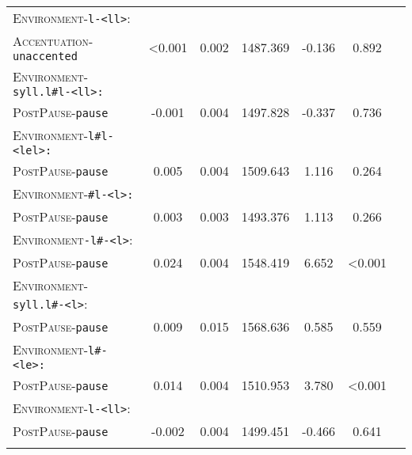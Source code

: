 \begin{table}
{\begin{tabular}{lSSSSSS}
		\textsc{Environment}-\texttt{l-<ll>}:&&&&&\\
		\textsc{Accentuation}-\texttt{unaccented} & \color{lsLightGray} <0.001 &\color{lsLightGray}  0.002 & \color{lsLightGray} 1487.369 &\color{lsLightGray}  -0.136 & \color{lsLightGray} 0.892 \\ 
		
		\textsc{Environment}-\texttt{syll.l\#l-<ll>:}&&&&&\\
		\textsc{PostPause}-\texttt{pause} &\color{lsLightGray}  -0.001 &\color{lsLightGray}  0.004 & \color{lsLightGray} 1497.828 &\color{lsLightGray}  -0.337 & \color{lsLightGray} 0.736 \\ 
		
		\textsc{Environment}-\texttt{l\#l-<lel>:}&&&&&\\
		\textsc{PostPause}-\texttt{pause} &\color{lsLightGray}  0.005 &\color{lsLightGray}  0.004 &\color{lsLightGray} 1509.643 & \color{lsLightGray} 1.116 &\color{lsLightGray}  0.264 \\ 
		
		\textsc{Environment}-\texttt{\#l-<l>:}&&&&&\\
		\textsc{PostPause}-\texttt{pause} & \color{lsLightGray} 0.003 &\color{lsLightGray}  0.003 & \color{lsLightGray} 1493.376 &\color{lsLightGray}  1.113 & \color{lsLightGray} 0.266 \\ 
		
		\textsc{Environment}\texttt{-l\#-<l>}:&&&&&\\
		\textsc{PostPause}-\texttt{pause} & 0.024 & 0.004 & 1548.419 & 6.652 &  <0.001 \\ 
		
		\textsc{Environment}-\texttt{syll.l\#-<l>}:&&&&&\\
		\textsc{PostPause}-\texttt{pause} &\color{lsLightGray}  0.009 &\color{lsLightGray}  0.015 & \color{lsLightGray} 1568.636 &\color{lsLightGray}  0.585 & \color{lsLightGray} 0.559 \\ 
		
		\textsc{Environment}-\texttt{l\#-<le>:}&&&&&\\
		\textsc{PostPause}-\texttt{pause} & 0.014 & 0.004 & 1510.953 & 3.780 &  <0.001 \\
		
		\textsc{Environment}-\texttt{l-<ll>}:&&&&&\\
		\textsc{PostPause}-\texttt{pause} & \color{lsLightGray} -0.002 & \color{lsLightGray} 0.004 & \color{lsLightGray} 1499.451 &\color{lsLightGray}  -0.466 & \color{lsLightGray} 0.641 \\ 
	\lspbottomrule 
			\end{tabular}}
\end{table}


